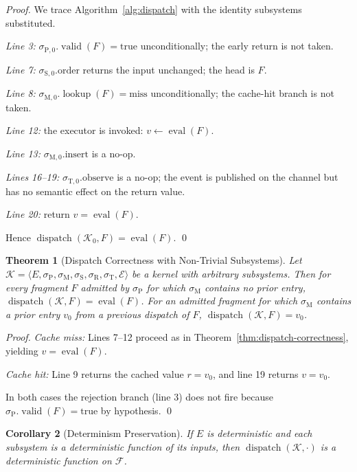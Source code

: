 \documentclass[twocolumn,11pt,a4paper]{article}
\newtheorem{theorem}{Theorem}[section]
\newtheorem{corollary}[theorem]{Corollary}
\DeclareMathOperator{\dispatch}{dispatch}
\DeclareMathOperator{\eval}{eval}
\DeclareMathOperator{\valid}{valid}
\DeclareMathOperator{\lookup}{lookup}
\newcommand{\Kernel}{\mathcal{K}}
\newcommand{\Frag}{F}
\newcommand{\Sub}{\sigma}
\newcommand{\Exec}{E}
\newcommand{\Evt}{\mathcal{E}}
\newcommand{\Pve}{\Sub_{\mathrm{P}}}
\newcommand{\Cmm}{\Sub_{\mathrm{M}}}
\newcommand{\Pss}{\Sub_{\mathrm{S}}}
\newcommand{\Dic}{\Sub_{\mathrm{R}}}
\newcommand{\Tem}{\Sub_{\mathrm{T}}}
\begin{document}
\begin{proof}
We trace Algorithm~\ref{alg:dispatch} with the identity subsystems substituted.

\emph{Line 3:} $\sigma_{\mathrm{P},0}.\valid(\Frag) = \mathrm{true}$ unconditionally; the early return is not taken.

\emph{Line 7:} $\sigma_{\mathrm{S},0}.\text{order}$ returns the input unchanged; the head is $\Frag$.

\emph{Line 8:} $\sigma_{\mathrm{M},0}.\lookup(\Frag) = \mathrm{miss}$ unconditionally; the cache-hit branch is not taken.

\emph{Line 12:} the executor is invoked: $v \gets \eval(\Frag)$.

\emph{Line 13:} $\sigma_{\mathrm{M},0}.\text{insert}$ is a no-op.

\emph{Lines 16--19:} $\sigma_{\mathrm{T},0}.\text{observe}$ is a no-op; the event is published on the channel but has no semantic effect on the return value.

\emph{Line 20:} return $v = \eval(\Frag)$.

Hence $\dispatch(\Kernel_0, \Frag) = \eval(\Frag)$. \qed
\end{proof}

\begin{theorem}[Dispatch Correctness with Non-Trivial Subsystems]
\label{thm:dispatch-general}
Let $\Kernel = \langle \Exec, \Pve, \Cmm, \Pss, \Dic, \Tem, \Evt \rangle$ be a kernel with arbitrary subsystems. Then for every fragment $\Frag$ admitted by $\Pve$ for which $\Cmm$ contains no prior entry, $\dispatch(\Kernel, \Frag) = \eval(\Frag)$. For an admitted fragment for which $\Cmm$ contains a prior entry $v_0$ from a previous dispatch of $\Frag$, $\dispatch(\Kernel, \Frag) = v_0$.
\end{theorem}

\begin{proof}
\emph{Cache miss:} Lines 7--12 proceed as in Theorem~\ref{thm:dispatch-correctness}, yielding $v = \eval(\Frag)$.

\emph{Cache hit:} Line 9 returns the cached value $r = v_0$, and line 19 returns $v = v_0$.

In both cases the rejection branch (line 3) does not fire because $\Pve.\valid(\Frag) = \mathrm{true}$ by hypothesis. \qed
\end{proof}

\begin{corollary}[Determinism Preservation]
\label{cor:determinism-preserve}
If $\Exec$ is deterministic and each subsystem is a deterministic function of its inputs, then $\dispatch(\Kernel, \cdot)$ is a deterministic function on $\mathcal{F}$.
\end{corollary}
\end{document}
